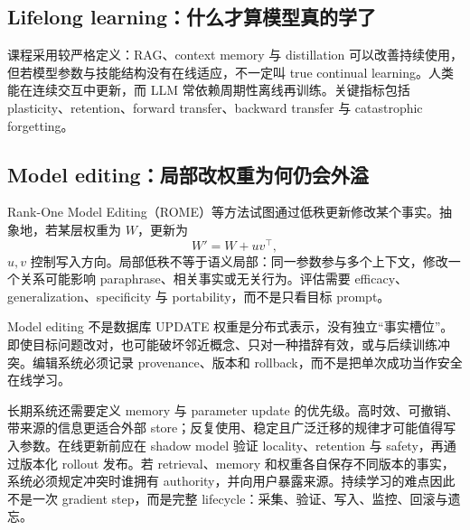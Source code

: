 \subsection{Lifelong learning：什么才算模型真的学了}

课程采用较严格定义：RAG、context memory 与 distillation 可以改善持续使用，但若模型参数与技能结构没有在线适应，不一定叫 true continual learning。人类能在连续交互中更新，而 LLM 常依赖周期性离线再训练。关键指标包括 plasticity、retention、forward transfer、backward transfer 与 catastrophic forgetting。




\subsection{Model editing：局部改权重为何仍会外溢}

Rank-One Model Editing（ROME）等方法试图通过低秩更新修改某个事实。抽象地，若某层权重为 $W$，更新为
\[
W'=W+uv^{\top},
\]
$u,v$ 控制写入方向。局部低秩不等于语义局部：同一参数参与多个上下文，修改一个关系可能影响 paraphrase、相关事实或无关行为。评估需要 efficacy、generalization、specificity 与 portability，而不是只看目标 prompt。


\begin{warningbox}{Model editing 不是数据库 UPDATE}
权重是分布式表示，没有独立“事实槽位”。即使目标问题改对，也可能破坏邻近概念、只对一种措辞有效，或与后续训练冲突。编辑系统必须记录 provenance、版本和 rollback，而不是把单次成功当作安全在线学习。
\end{warningbox}

长期系统还需要定义 memory 与 parameter update 的优先级。高时效、可撤销、带来源的信息更适合外部 store；反复使用、稳定且广泛迁移的规律才可能值得写入参数。在线更新前应在 shadow model 验证 locality、retention 与 safety，再通过版本化 rollout 发布。若 retrieval、memory 和权重各自保存不同版本的事实，系统必须规定冲突时谁拥有 authority，并向用户暴露来源。持续学习的难点因此不是一次 gradient step，而是完整 lifecycle：采集、验证、写入、监控、回滚与遗忘。

